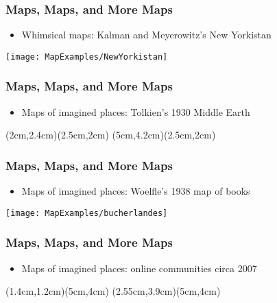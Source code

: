 \documentclass{beamer}
\begin{document}
\begin{frame}[plain]\frametitle{Maps, Maps, and More Maps}
\begin{itemize}
\item Whimsical maps: Kalman and Meyerowitz's New Yorkistan
\end{itemize} 
\begin{center}\texttt{[image: MapExamples/NewYorkistan]}
\end{center}
\end{frame}




\begin{frame}[plain]\frametitle{Maps, Maps, and More Maps}
\begin{itemize}
\item Maps of imagined places: Tolkien's 1930 Middle Earth
\end{itemize} 
\begin{center}
(2cm,2.4cm)(2.5cm,2cm) 
(5cm,4.2cm)(2.5cm,2cm) 
\end{center}
\end{frame}

\begin{frame}[plain]\frametitle{Maps, Maps, and More Maps}
\begin{itemize}
\item Maps of imagined places: Woelfle's 1938 map of books
\end{itemize} 
\begin{center}\texttt{[image: MapExamples/bucherlandes]}
\end{center}
\end{frame}


\begin{frame}[plain]
\frametitle{Maps, Maps, and More Maps}
\begin{itemize}
\item Maps of imagined places: online communities circa 2007 
\end{itemize}
\begin{center}
(1.4cm,1.2cm)(5cm,4cm) 
(2.55cm,3.9cm)(5cm,4cm) 
\end{center}
\end{frame} 
\end{document}
